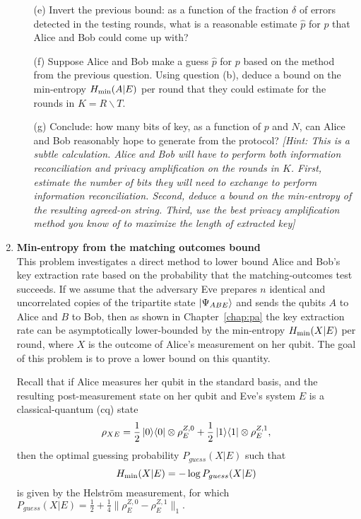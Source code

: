 \documentclass[12pt]{article}
\begin{document}
\begin{enumerate}
\begin{enumerate}
\item[(e)] Invert the previous bound: as a function of the fraction $\delta$ of errors detected in the testing rounds, what is a reasonable estimate $\hat{p}$ for $p$ that Alice and Bob could come up with? 
\item[(f)] Suppose Alice and Bob make a guess $\hat{p}$ for $p$ based on the method from the previous question. Using question (b), deduce a bound on the min-entropy $H_{\rm min}(A|E)$ per round that they could estimate for the rounds in $K = R\backslash T$. 
\item[(g)] Conclude: how many bits of key, as a function of $p$ and $N$, can Alice and Bob reasonably hope to generate from the protocol? \emph{[Hint: This is a subtle calculation. Alice and Bob will have to perform both information reconciliation and privacy amplification on the rounds in $K$. First, estimate the number of bits they will need to exchange to perform information reconciliation. Second, deduce a bound on the min-entropy of the resulting agreed-on string. Third, use the best privacy amplification method you know of to maximize the length of extracted key]}
\end{enumerate}


\item {\bf Min-entropy from the matching outcomes bound}\label{ex:matching-min}\\
This problem investigates a direct method to lower bound Alice and Bob's key extraction rate based on the probability that the matching-outcomes test succeeds. If we assume that the adversary Eve prepares $n$ identical and uncorrelated copies of the tripartite state $\ket{\Psi_{ABE}}$ and sends the qubits $A$ to Alice and $B$ to Bob, then as shown in Chapter~\ref{chap:pa} the key extraction rate can be asymptotically lower-bounded by the min-entropy $H_{\rm min}(X|E)$ per round, where $X$ is the outcome of Alice's measurement on her qubit. The goal of this problem is to prove a lower bound on this quantity.

Recall that if Alice measures her qubit in the standard basis, and the resulting post-measurement state on her qubit and Eve's system $E$ is a classical-quantum (cq) state
$$\rho_{XE} = \frac{1}{2}\ket{0}\!\bra{0} \otimes \rho_E^{Z,0}+\frac{1}{2}\ket{1}\!\bra{1} \otimes \rho_E^{Z,1},$$
then the optimal guessing probability $P_{guess}(X|E)$ such that
$$H_{\rm min}(X|E) = - \log P_{guess}(X|E)$$
is given by the Helstr\"om measurement, for which
$P_{guess}(X|E) = \frac{1}{2}+\frac{1}{4}\|\rho_E^{Z,0}-\rho_E^{Z,1}\|_1.$


\end{enumerate}
\end{document}
